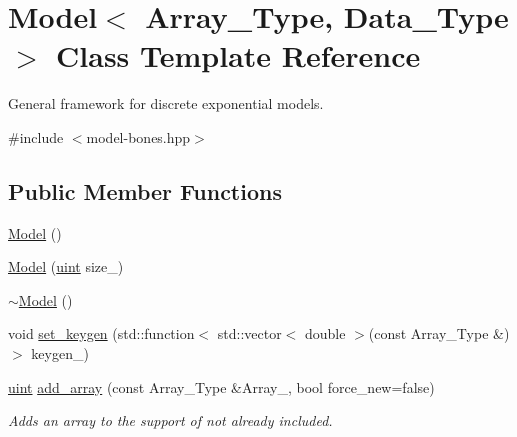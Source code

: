 \hypertarget{class_model}{}\section{Model$<$ Array\+\_\+\+Type, Data\+\_\+\+Type $>$ Class Template Reference}
\label{class_model}


General framework for discrete exponential models.  




{\ttfamily \#include $<$model-\/bones.\+hpp$>$}

\subsection*{Public Member Functions}
\begin{DoxyCompactItemize}
\item 
\hyperlink{class_model_a38122122aa4eb799b90ed1ee49b9410c}{Model} ()
\item 
\hyperlink{class_model_a841a883c666ecd9b07385bfb36078bc5}{Model} (\hyperlink{typedefs_8hpp_a91ad9478d81a7aaf2593e8d9c3d06a14}{uint} size\+\_\+)
\item 
\hyperlink{class_model_aaed0a5937479c213e620bf8095ddea5d}{$\sim$\+Model} ()
\item 
void \hyperlink{class_model_afa4736153fa419e1f141839eda735dfe}{set\+\_\+keygen} (std\+::function$<$ std\+::vector$<$ double $>$(const Array\+\_\+\+Type \&)$>$ keygen\+\_\+)
\item 
\hyperlink{typedefs_8hpp_a91ad9478d81a7aaf2593e8d9c3d06a14}{uint} \hyperlink{class_model_a28ad7090cb5b3f3be9e24d9aef15ce75}{add\+\_\+array} (const Array\+\_\+\+Type \&Array\+\_\+, bool force\+\_\+new=false)
\begin{DoxyCompactList}\small\item\em Adds an array to the support of not already included. \end{DoxyCompactList}\end{DoxyCompactItemize}
